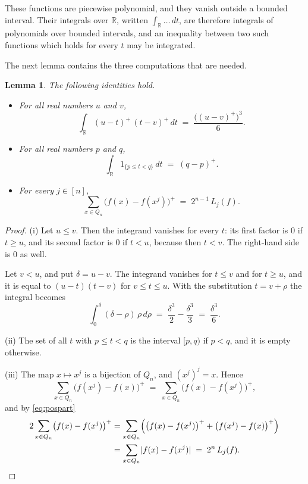 \documentclass[11pt,reqno]{amsart}
\newtheorem{lemma}[theorem]{Lemma}
\theoremstyle{definition}
\theoremstyle{remark}
\numberwithin{equation}{section}
\theoremstyle{named}
\theoremstyle{plain}
\newcommand{\R}{\mathbb{R}}
\newcommand{\abs}[1]{\lvert #1\rvert}
\begin{document}
These functions are piecewise polynomial, and they vanish outside a bounded interval. Their
integrals over $\R$, written $\int_{\R}\dots\,dt$, are therefore integrals of polynomials over
bounded intervals, and an inequality between two such functions which holds for every $t$ may be
integrated.

The next lemma contains the three computations that are needed.

\begin{lemma}\label{lem:integrals}
The following identities hold.
\begin{itemize}
\item[\textup{(i)}] For all real numbers $u$ and $v$,
\[
   \int_{\R}(u-t)^{+}\,(t-v)^{+}\,dt\;=\;\frac{\bigl((u-v)^{+}\bigr)^{3}}{6}.
\]
\item[\textup{(ii)}] For all real numbers $p$ and $q$,
\[
   \int_{\R}1_{\{p\le t<q\}}\,dt\;=\;(q-p)^{+}.
\]
\item[\textup{(iii)}] For every $j\in[n]$,
\[
   \sum_{x\in Q_n}\bigl(f(x)-f(x^{j})\bigr)^{+}\;=\;2^{n-1}\,L_j(f).
\]
\end{itemize}
\end{lemma}

\begin{proof}
(i) Let $u\le v$. Then the integrand vanishes for every $t$: its first factor is $0$ if $t\ge u$,
and its second factor is $0$ if $t<u$, because then $t<v$. The right-hand side is $0$ as well.

Let $v<u$, and put $\delta=u-v$. The integrand vanishes for $t\le v$ and for $t\ge u$, and it is
equal to $(u-t)(t-v)$ for $v\le t\le u$. With the substitution $t=v+\rho$ the integral becomes
\[
   \int_{0}^{\delta}(\delta-\rho)\,\rho\,d\rho\;=\;\frac{\delta^{3}}{2}-\frac{\delta^{3}}{3}
   \;=\;\frac{\delta^{3}}{6}.
\]

(ii) The set of all $t$ with $p\le t<q$ is the interval $[p,q)$ if $p<q$, and it is empty
otherwise.

(iii) The map $x\mapsto x^{j}$ is a bijection of $Q_n$, and $(x^{j})^{j}=x$. Hence
\[
   \sum_{x\in Q_n}\bigl(f(x^{j})-f(x)\bigr)^{+}\;=\;\sum_{x\in Q_n}\bigl(f(x)-f(x^{j})\bigr)^{+},
\]
and by \eqref{eq:pospart}
\begin{align*}
   2\sum_{x\in Q_n}\bigl(f(x)-f(x^{j})\bigr)^{+}
   &=\sum_{x\in Q_n}\Bigl(\bigl(f(x)-f(x^{j})\bigr)^{+}+\bigl(f(x^{j})-f(x)\bigr)^{+}\Bigr)\\
   &=\sum_{x\in Q_n}\abs{f(x)-f(x^{j})}\;=\;2^{n}\,L_j(f). \qedhere
\end{align*}
\end{proof}
\end{document}
